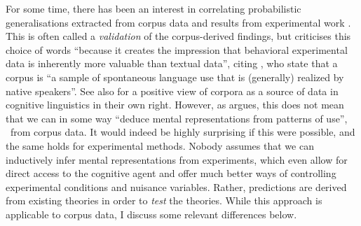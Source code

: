 For some time, there has been an interest in correlating probabilistic generalisations extracted from corpus data and results from experimental work \citep{ArppeJaervikivi2007,BresnanEa2007,BresnanFord2010,DivjakGries2008,DivjakEa2016,FordBresnan2013}.
This is often called a \textit{validation} of the corpus-derived findings, but \citet[303]{Divjak2016a} criticises this choice of words ``because it creates the impression that behavioral experimental data is inherently more valuable than textual data'', citing \cite{TummersEa2005}, who state that a corpus is ``a sample of spontaneous language use that is (generally) realized by native speakers''.
See also \citet{Newman2011} for a positive view of corpora as a source of data in cognitive linguistics in their own right.
However, as \citet[486--487]{Dabrowska2016} argues, this does not mean that we can in some way ``deduce mental representations from patterns of use'', \ie\ from corpus data.
It would indeed be highly surprising if this were possible, and the same holds for experimental methods.
Nobody assumes that we can inductively infer mental representations from experiments, which even allow for direct access to the cognitive agent and offer much better ways of controlling experimental conditions and nuisance variables.
Rather, predictions are derived from existing theories in order to \textit{test} the theories.
While this approach is applicable to corpus data, I discuss some relevant differences below.

